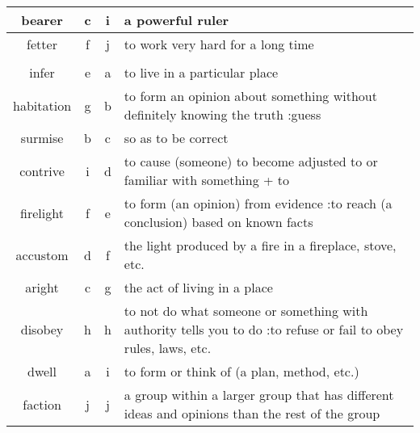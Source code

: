 \documentclass[a4paper]{article}
\begin{document}
\begin{center}
\begin{tabular}{|c|c|c|m{}|}
\hline
bearer & c & i &  a powerful ruler \\
\hline
fetter & f & j &  to work very hard for a long time \\
\hline
 & & & \\
\hline
infer & e & a &  to live in a particular place \\
\hline
habitation & g & b &  to form an opinion about something without definitely knowing the truth :guess \\
\hline
surmise & b & c &  so as to be correct \\
\hline
contrive & i & d &  to cause (someone) to become adjusted to or familiar with something + to \\
\hline
firelight & f & e &  to form (an opinion) from evidence :to reach (a conclusion) based on known facts \\
\hline
accustom & d & f &  the light produced by a fire in a fireplace, stove, etc. \\
\hline
aright & c & g &  the act of living in a place \\
\hline
disobey & h & h &  to not do what someone or something with authority tells you to do :to refuse or fail to obey rules, laws, etc. \\
\hline
dwell & a & i &  to form or think of (a plan, method, etc.) \\
\hline
faction & j & j &  a group within a larger group that has different ideas and opinions than the rest of the group \\
\hline
\end{tabular}
\end{center}
\end{document}
